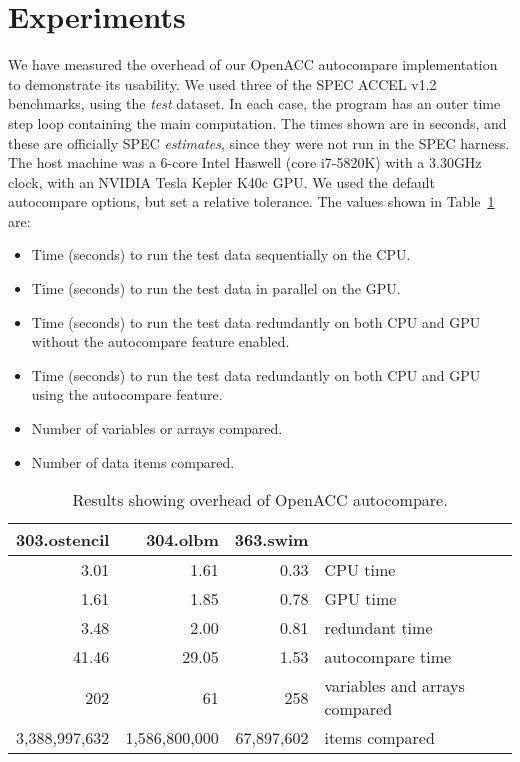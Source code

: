 \section{Experiments}

We have measured the overhead of our OpenACC autocompare implementation to demonstrate its usability.
We used three of the SPEC ACCEL v1.2 benchmarks, using the \emph{test} dataset.
In each case, the program has an outer time step loop containing the main computation.
The times shown are in seconds, and these are officially SPEC \emph{estimates}, since they were not run in the SPEC harness.
The host machine was a 6-core Intel Haswell (core i7-5820K) with a 3.30GHz clock, with an NVIDIA Tesla Kepler K40c GPU.
We used the default autocompare options, but set a relative tolerance.
The values shown in Table~\ref{res1} are:
\begin{itemize}
\item Time (seconds) to run the test data sequentially on the CPU.
\item Time (seconds) to run the test data in parallel on the GPU.
\item Time (seconds) to run the test data redundantly on both CPU and GPU without the autocompare feature enabled.
\item Time (seconds) to run the test data redundantly on both CPU and GPU using the autocompare feature.
\item Number of variables or arrays compared.
\item Number of data items compared.
\end{itemize}







\begin{table}
\begin{center}
\begin{tabular}{rrrl}
\hline
303.ostencil & 304.olbm & 363.swim & \\
\hline
 3.01 &  1.61 & 0.33 & CPU time \\
 1.61 &  1.85 & 0.78 & GPU time \\
 3.48 &  2.00 & 0.81 & redundant time \\
41.46 & 29.05 & 1.53 & autocompare time \\
202 & 61 & 258 & variables and arrays compared \\
3,388,997,632 & 1,586,800,000 & 67,897,602 & items compared \\
\hline
\end{tabular}
\end{center}
\caption{Results showing overhead of OpenACC autocompare.}
\label{res1}
\end{table}

